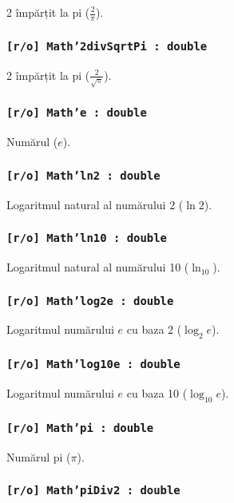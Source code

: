 2 împărțit la pi ($\frac{2}{\pi}$).

\subsubsection{\texttt{[r/o] Math'2divSqrtPi : double}}

2 împărțit la pi ($\frac{2}{\sqrt{\pi}}$).

\subsubsection{\texttt{[r/o] Math'e : double}}

Numărul ($e$).

\subsubsection{\texttt{[r/o] Math'ln2 : double}}

Logaritmul natural al numărului 2 ($\ln{2}$).

\subsubsection{\texttt{[r/o] Math'ln10 : double}}

Logaritmul natural al numărului 10 ($\ln_{10}$).

\subsubsection{\texttt{[r/o] Math'log2e : double}}

Logaritmul numărului $e$ cu baza 2 ($\log_{2}{e}$).

\subsubsection{\texttt{[r/o] Math'log10e : double}}

Logaritmul numărului $e$ cu baza 10 ($\log_{10}{e}$).

\subsubsection{\texttt{[r/o] Math'pi : double}}

Numărul pi ($\pi$).

\subsubsection{\texttt{[r/o] Math'piDiv2 : double}}

